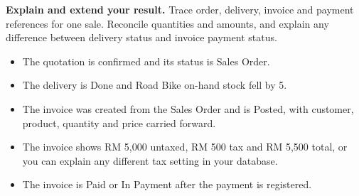 

\begin{verification}
\textbf{Explain and extend your result.} Trace order, delivery, invoice and payment references for one sale. Reconcile quantities and amounts, and explain any difference between delivery status and invoice payment status.


\begin{itemize}
  \item The quotation is confirmed and its status is Sales Order.
  \item The delivery is Done and Road Bike on-hand stock fell by 5.
  \item The invoice was created from the Sales Order and is Posted, with customer, product, quantity and price carried forward.
  \item The invoice shows RM 5,000 untaxed, RM 500 tax and RM 5,500 total, or you can explain any different tax setting in your database.
  \item The invoice is Paid or In Payment after the payment is registered.
\end{itemize}
\end{verification}
